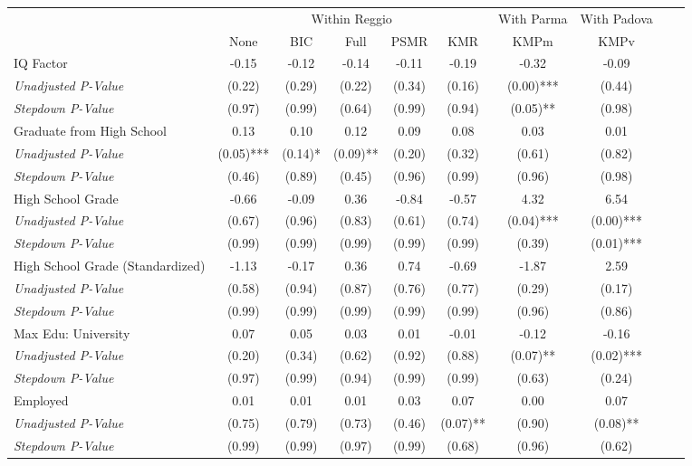 \begin{tabular}{l c c c c c c c c c}
\toprule
& \multicolumn{5}{c}{Within Reggio} & With Parma & With Padova \\\cmidrule(lr){2-6} \cmidrule(lr){7} \cmidrule(lr){8}
 & None & BIC & Full & PSMR & KMR & KMPm & KMPv \\
\midrule
IQ Factor & -0.15 & -0.12 & -0.14 & -0.11 & -0.19 & -0.32 & -0.09 \\
\quad \textit{Unadjusted P-Value} & (0.22) & (0.29) & (0.22) & (0.34) & (0.16) & (0.00)*** & (0.44) \\
\quad \textit{Stepdown P-Value} & (0.97) & (0.99) & (0.64) & (0.99) & (0.94) & (0.05)** & (0.98) \\
Graduate from High School & 0.13 & 0.10 & 0.12 & 0.09 & 0.08 & 0.03 & 0.01 \\
\quad \textit{Unadjusted P-Value} & (0.05)*** & (0.14)* & (0.09)** & (0.20) & (0.32) & (0.61) & (0.82) \\
\quad \textit{Stepdown P-Value} & (0.46) & (0.89) & (0.45) & (0.96) & (0.99) & (0.96) & (0.98) \\
High School Grade & -0.66 & -0.09 & 0.36 & -0.84 & -0.57 & 4.32 & 6.54 \\
\quad \textit{Unadjusted P-Value} & (0.67) & (0.96) & (0.83) & (0.61) & (0.74) & (0.04)*** & (0.00)*** \\
\quad \textit{Stepdown P-Value} & (0.99) & (0.99) & (0.99) & (0.99) & (0.99) & (0.39) & (0.01)*** \\
High School Grade (Standardized) & -1.13 & -0.17 & 0.36 & 0.74 & -0.69 & -1.87 & 2.59 \\
\quad \textit{Unadjusted P-Value} & (0.58) & (0.94) & (0.87) & (0.76) & (0.77) & (0.29) & (0.17) \\
\quad \textit{Stepdown P-Value} & (0.99) & (0.99) & (0.99) & (0.99) & (0.99) & (0.96) & (0.86) \\
Max Edu: University & 0.07 & 0.05 & 0.03 & 0.01 & -0.01 & -0.12 & -0.16 \\
\quad \textit{Unadjusted P-Value} & (0.20) & (0.34) & (0.62) & (0.92) & (0.88) & (0.07)** & (0.02)*** \\
\quad \textit{Stepdown P-Value} & (0.97) & (0.99) & (0.94) & (0.99) & (0.99) & (0.63) & (0.24) \\
Employed & 0.01 & 0.01 & 0.01 & 0.03 & 0.07 & 0.00 & 0.07 \\
\quad \textit{Unadjusted P-Value} & (0.75) & (0.79) & (0.73) & (0.46) & (0.07)** & (0.90) & (0.08)** \\
\quad \textit{Stepdown P-Value} & (0.99) & (0.99) & (0.97) & (0.99) & (0.68) & (0.96) & (0.62) \\

\end{tabular}
